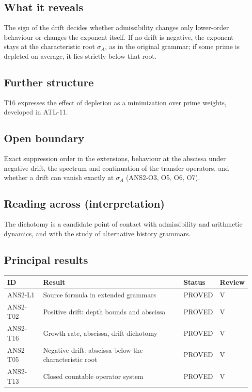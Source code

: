 \documentclass[
  11pt,
]{article}
\begin{document}
\hypertarget{what-it-reveals-9}{%
\subsection{What it reveals}\label{what-it-reveals-9}}

The sign of the drift decides whether admissibility changes only
lower-order behaviour or changes the exponent itself. If no drift is
negative, the exponent stays at the characteristic root \(\sigma_A\), as
in the original grammar; if some prime is depleted on average, it lies
strictly below that root.

\hypertarget{further-structure-9}{%
\subsection{Further structure}\label{further-structure-9}}

T16 expresses the effect of depletion as a minimization over prime
weights, developed in ATL-11.

\hypertarget{open-boundary-9}{%
\subsection{Open boundary}\label{open-boundary-9}}

Exact suppression order in the extensions, behaviour at the abscissa
under negative drift, the spectrum and continuation of the transfer
operators, and whether a drift can vanish exactly at \(\sigma_A\)
(ANS2-O3, O5, O6, O7).

\hypertarget{reading-across-interpretation-9}{%
\subsection{Reading across
(interpretation)}\label{reading-across-interpretation-9}}

The dichotomy is a candidate point of contact with admissibility and
arithmetic dynamics, and with the study of alternative history grammars.

\hypertarget{principal-results-9}{%
\subsection{Principal results}\label{principal-results-9}}

\begin{longtable}[]{@{}llll@{}}
\toprule
ID & Result & Status & Review\tabularnewline
\midrule
\endhead
ANS2-L1 & Source formula in extended grammars & PROVED &
V\tabularnewline
ANS2-T02 & Positive drift: depth bounds and abscissa & PROVED &
V\tabularnewline
ANS2-T16 & Growth rate, abscissa, drift dichotomy & PROVED &
V\tabularnewline
ANS2-T05 & Negative drift: abscissa below the characteristic root &
PROVED & V\tabularnewline
ANS2-T13 & Closed countable operator system & PROVED & V\tabularnewline
\bottomrule
\end{longtable}
\end{document}
